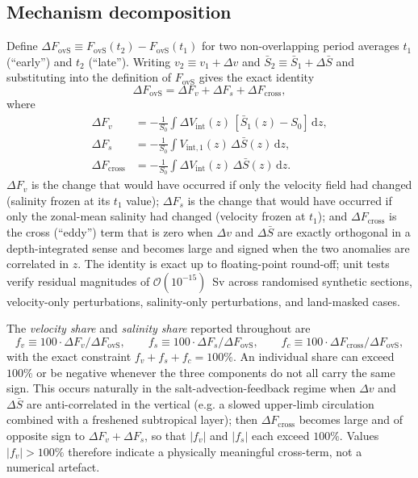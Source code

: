 \documentclass[11pt,a4paper]{article}
\newcommand{\Fovs}{F_\mathrm{ovS}}
\newcommand{\dFv}{\Delta F_v}
\newcommand{\dFs}{\Delta F_s}
\newcommand{\dFc}{\Delta F_\mathrm{cross}}
\begin{document}
\subsection*{Mechanism decomposition}

Define $\Delta\Fovs \equiv \Fovs(t_2) - \Fovs(t_1)$ for two non-overlapping period averages $t_1$ (``early'') and $t_2$ (``late''). Writing $v_2 \equiv v_1 + \Delta v$ and $\bar{S}_2 \equiv \bar{S}_1 + \Delta\bar{S}$ and substituting into the definition of $\Fovs$ gives the exact identity
\begin{equation}
\Delta \Fovs = \dFv + \dFs + \dFc,
\end{equation}
where
\begin{equation}
\begin{aligned}
\dFv &= -\frac{1}{S_0}\int \Delta V_\mathrm{int}(z)\,
        [\bar{S}_1(z) - S_0]\,\mathrm{d}z,\\[2pt]
\dFs &= -\frac{1}{S_0}\int V_{\mathrm{int},1}(z)\,
        \Delta\bar{S}(z)\,\mathrm{d}z,\\[2pt]
\dFc &= -\frac{1}{S_0}\int \Delta V_\mathrm{int}(z)\,
        \Delta\bar{S}(z)\,\mathrm{d}z.
\end{aligned}
\end{equation}
$\dFv$ is the change that would have occurred if only the velocity field had changed (salinity frozen at its $t_1$ value); $\dFs$ is the change that would have occurred if only the zonal-mean salinity had changed (velocity frozen at $t_1$); and $\dFc$ is the cross (``eddy'') term that is zero when $\Delta v$ and $\Delta\bar{S}$ are exactly orthogonal in a depth-integrated sense and becomes large and signed when the two anomalies are correlated in $z$. The identity is exact up to floating-point round-off; unit tests verify residual magnitudes of $\mathcal{O}(10^{-15})$~Sv across randomised synthetic sections, velocity-only perturbations, salinity-only perturbations, and land-masked cases.

The \emph{velocity share} and \emph{salinity share} reported throughout are
\begin{equation}
f_v \equiv 100\cdot \dFv/\Delta\Fovs,\qquad
f_s \equiv 100\cdot \dFs/\Delta\Fovs,\qquad
f_c \equiv 100\cdot \dFc/\Delta\Fovs,
\end{equation}
with the exact constraint $f_v + f_s + f_c = 100\%$. An individual share can exceed $100\%$ or be negative whenever the three components do not all carry the same sign. This occurs naturally in the salt-advection-feedback regime when $\Delta v$ and $\Delta\bar{S}$ are anti-correlated in the vertical (e.g. a slowed upper-limb circulation combined with a freshened subtropical layer); then $\dFc$ becomes large and of opposite sign to $\dFv + \dFs$, so that $|f_v|$ and $|f_s|$ each exceed $100\%$. Values $|f_v| > 100\%$ therefore indicate a physically meaningful cross-term, not a numerical artefact.
\end{document}
